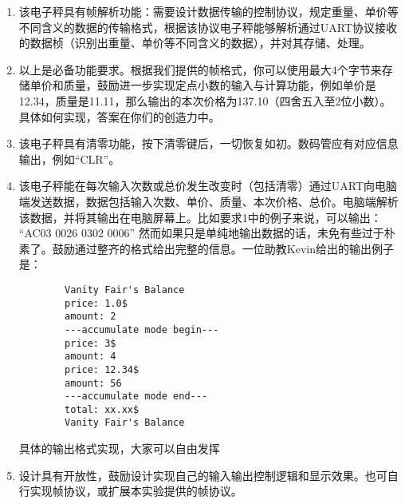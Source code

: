 \begin{enumerate}
    \item 该电子秤具有帧解析功能：需要设计数据传输的控制协议，规定重量、单价等不同含义的数据的传输格式，根据该协议电子秤能够解析通过UART协议接收的数据桢（识别出重量、单价等不同含义的数据），并对其存储、处理。
    \item 以上是必备功能要求。根据我们提供的帧格式，你可以使用最大4个字节来存储单价和质量，鼓励进一步实现定点小数的输入与计算功能，例如单价是12.34，质量是11.11，那么输出的本次价格为137.10（四舍五入至2位小数）。具体如何实现，答案在你们的创造力中。
    \item 该电子秤具有清零功能，按下清零键后，一切恢复如初。数码管应有对应信息输出，例如“CLR”。
    \item 该电子秤能在每次输入次数或总价发生改变时（包括清零）通过UART向电脑端发送数据，数据包括输入次数、单价、质量、本次价格、总价。电脑端解析该数据，并将其输出在电脑屏幕上。比如要求1中的例子来说，可以输出： “AC03 0026 0302 0006”
          \subitem 然而如果只是单纯地输出数据的话，未免有些过于朴素了。鼓励通过整齐的格式给出完整的信息。一位助教Kevin给出的输出例子是：
          \begin{lstlisting}
        Vanity Fair's Balance
        price: 1.0$
        amount: 2
        ---accumulate mode begin---
        price: 3$
        amount: 4
        price: 12.34$
        amount: 56
        ---accumulate mode end---
        total: xx.xx$
        Vanity Fair's Balance
    \end{lstlisting}
          具体的输出格式实现，大家可以自由发挥
    \item 设计具有开放性，鼓励设计实现自己的输入输出控制逻辑和显示效果。也可自行实现帧协议，或扩展本实验提供的帧协议。
\end{enumerate}
